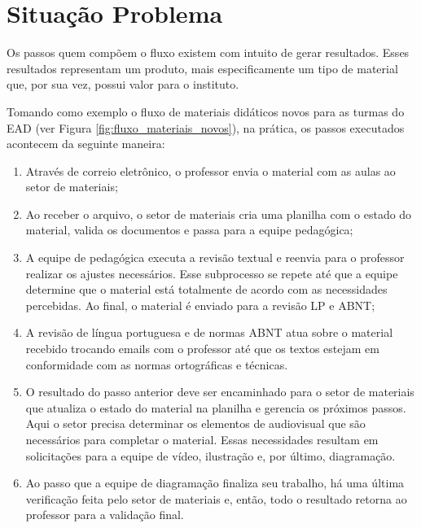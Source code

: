 
\section{Situação Problema}

Os passos quem compõem o fluxo existem com intuito de gerar resultados. Esses resultados representam um produto, mais especificamente um tipo de material que, por sua vez, possui valor para o instituto. 

Tomando como exemplo o fluxo de materiais didáticos novos para as turmas do EAD (ver Figura \ref{fig:fluxo_materiais_novos}), na prática, os passos executados acontecem da seguinte maneira:

\begin{enumerate}
  \item Através de correio eletrônico, o professor envia o material com as aulas ao setor de materiais;
  \item Ao receber o arquivo, o setor de materiais cria uma planilha com o estado do material, valida os documentos e passa para a equipe pedagógica;
  \item A equipe de pedagógica executa a revisão textual e reenvia para o professor realizar os ajustes necessários. Esse subprocesso se repete até que a equipe determine que o material está totalmente de acordo com as necessidades percebidas. Ao final, o material é enviado para a revisão LP e ABNT;
  \item A revisão de língua portuguesa e de normas ABNT atua sobre o material recebido trocando emails com o professor até que os textos estejam em conformidade com as normas ortográficas e técnicas.
  \item O resultado do passo anterior deve ser encaminhado para o setor de materiais que atualiza o estado do material na planilha e gerencia os próximos passos. Aqui o setor precisa determinar os elementos de audiovisual que são necessários para completar o material. Essas necessidades resultam em solicitações para a equipe de vídeo, ilustração e, por último, diagramação. 
  \item Ao passo que a equipe de diagramação finaliza seu trabalho, há uma última verificação feita pelo setor de materiais e, então, todo o resultado retorna ao professor para a validação final.
\end{enumerate}

